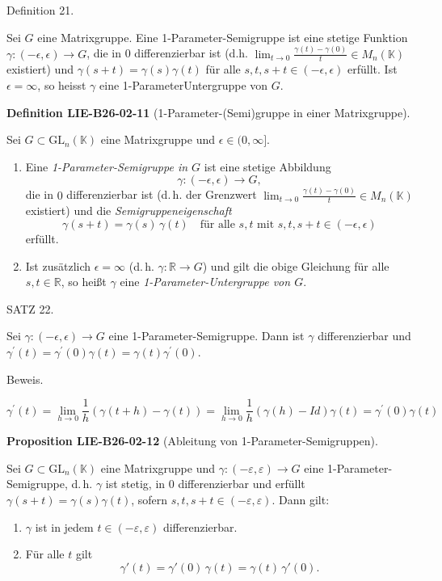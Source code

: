 \documentclass[10pt, letterpaper]{article}
\newcommand{\GL}{\mathrm{GL}}
\newcommand{\CustomHeading}[3]{%
  \par\medskip\noindent%
  \textbf{#1 #2} \textnormal{(#3)}.\enskip%
}
\newenvironment{DEF}[2]{\begin{unitbox}\CustomHeading{Definition}{#1}{#2}}{\end{unitbox}}
\newenvironment{PROP}[2]{\begin{unitbox}\CustomHeading{Proposition}{#1}{#2}}{\end{unitbox}}
\begin{document}
Definition 21. 


Sei $G$ eine Matrixgruppe. Eine 1-Parameter-Semigruppe ist eine stetige Funktion $\gamma:(-\epsilon, \epsilon) \rightarrow G$, die in 0 differenzierbar ist (d.h. $\lim _{t \rightarrow 0} \frac{\gamma(t)-\gamma(0)}{t} \in M_{n}(\mathbb{K})$ existiert) und $\gamma(s+t)=\gamma(s) \gamma(t)$ für alle $s, t, s+t \in(-\epsilon, \epsilon)$ erfüllt. Ist $\epsilon=\infty$, so heisst $\gamma$ eine 1-ParameterUntergruppe von $G$.



\begin{DEF}{LIE-B26-02-11}{1-Parameter-(Semi)gruppe in einer Matrixgruppe}
Sei $G\subset \GL_n(\mathbb{K})$ eine Matrixgruppe und $\epsilon\in(0,\infty]$.
\begin{enumerate}\itemsep0.2em
\item Eine \emph{1-Parameter-Semigruppe in $G$} ist eine stetige Abbildung
\[
\gamma:(-\epsilon,\epsilon)\longrightarrow G,
\]
die in $0$ differenzierbar ist (d.\,h. der Grenzwert
$\displaystyle\lim_{t\to 0}\frac{\gamma(t)-\gamma(0)}{t}\in M_n(\mathbb{K})$ existiert) und die \emph{Semigruppeneigenschaft}
\[
\gamma(s+t)=\gamma(s)\,\gamma(t)
\quad\text{für alle $s,t$ mit $s,t,s+t\in(-\epsilon,\epsilon)$}
\]
erfüllt.
\item Ist zusätzlich $\epsilon=\infty$ (d.\,h. $\gamma:\mathbb{R}\to G$) und gilt die obige Gleichung für alle $s,t\in\mathbb{R}$, so heißt $\gamma$ eine \emph{1-Parameter-Untergruppe von $G$}.
\end{enumerate}
\end{DEF}




SATZ 22. 

Sei $\gamma:(-\epsilon, \epsilon) \rightarrow G$ eine 1-Parameter-Semigruppe. Dann ist $\gamma$ differenzierbar und $\gamma^{\prime}(t)=\gamma^{\prime}(0) \gamma(t)=\gamma(t) \gamma^{\prime}(0)$.

Beweis.

$$
\gamma^{\prime}(t)=\lim _{h \rightarrow 0} \frac{1}{h}(\gamma(t+h)-\gamma(t))=\lim _{h \rightarrow 0} \frac{1}{h}(\gamma(h)-I d) \gamma(t)=\gamma^{\prime}(0) \gamma(t)
$$



\begin{PROP}{LIE-B26-02-12}{Ableitung von 1-Parameter-Semigruppen}
Sei $G\subset \GL_n(\mathbb{K})$ eine Matrixgruppe und
$\gamma:(-\varepsilon,\varepsilon)\to G$ eine 1-Parameter-Semigruppe,
d.\,h. $\gamma$ ist stetig, in $0$ differenzierbar und erfüllt
$\gamma(s+t)=\gamma(s)\gamma(t)$, sofern $s,t,s+t\in(-\varepsilon,\varepsilon)$.
Dann gilt:
\begin{enumerate}\itemsep0.2em
\item $\gamma$ ist in jedem $t\in(-\varepsilon,\varepsilon)$ differenzierbar.
\item Für alle $t$ gilt
\[
\gamma'(t)=\gamma'(0)\,\gamma(t)=\gamma(t)\,\gamma'(0).
\]
\end{enumerate}
\end{PROP}
\end{document}
